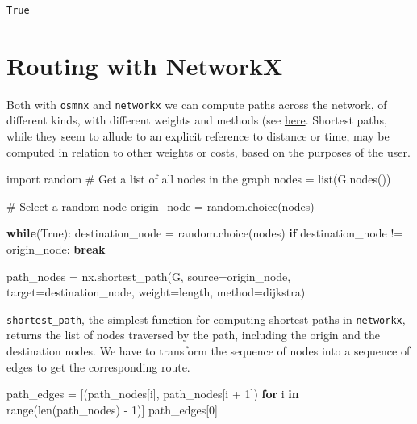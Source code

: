 \documentclass[
  letterpaper,
  DIV=11,
  numbers=noendperiod]{scrreprt}
\newenvironment{Shaded}{\begin{snugshade}}{\end{snugshade}}
\newcommand{\BuiltInTok}[1]{\textcolor[rgb]{0.00,0.23,0.31}{#1}}
\newcommand{\CommentTok}[1]{\textcolor[rgb]{0.37,0.37,0.37}{#1}}
\newcommand{\ControlFlowTok}[1]{\textcolor[rgb]{0.00,0.23,0.31}{\textbf{#1}}}
\newcommand{\DecValTok}[1]{\textcolor[rgb]{0.68,0.00,0.00}{#1}}
\newcommand{\ImportTok}[1]{\textcolor[rgb]{0.00,0.46,0.62}{#1}}
\newcommand{\KeywordTok}[1]{\textcolor[rgb]{0.00,0.23,0.31}{\textbf{#1}}}
\newcommand{\NormalTok}[1]{\textcolor[rgb]{0.00,0.23,0.31}{#1}}
\newcommand{\OperatorTok}[1]{\textcolor[rgb]{0.37,0.37,0.37}{#1}}
\newcommand{\StringTok}[1]{\textcolor[rgb]{0.13,0.47,0.30}{#1}}
\newcommand{\VariableTok}[1]{\textcolor[rgb]{0.07,0.07,0.07}{#1}}
\begin{document}
\begin{verbatim}
True
\end{verbatim}

\section{Routing with NetworkX}\label{routing-with-networkx}

Both with \texttt{osmnx} and \texttt{networkx} we can compute paths
across the network, of different kinds, with different weights and
methods (see
\href{https://networkx.org/documentation/stable/reference/algorithms/shortest_paths.html}{here}.
Shortest paths, while they seem to allude to an explicit reference to
distance or time, may be computed in relation to other weights or costs,
based on the purposes of the user.

\begin{Shaded}
\begin{Highlighting}[]
\ImportTok{import}\NormalTok{ random}
\CommentTok{\# Get a list of all nodes in the graph}
\NormalTok{nodes }\OperatorTok{=} \BuiltInTok{list}\NormalTok{(G.nodes())}

\CommentTok{\# Select a random node}
\NormalTok{origin\_node }\OperatorTok{=}\NormalTok{ random.choice(nodes)}

\ControlFlowTok{while}\NormalTok{(}\VariableTok{True}\NormalTok{):}
\NormalTok{    destination\_node }\OperatorTok{=}\NormalTok{ random.choice(nodes)}
    \ControlFlowTok{if}\NormalTok{ destination\_node }\OperatorTok{!=}\NormalTok{ origin\_node:}
        \ControlFlowTok{break}

\NormalTok{path\_nodes }\OperatorTok{=}\NormalTok{ nx.shortest\_path(G, source}\OperatorTok{=}\NormalTok{origin\_node, target}\OperatorTok{=}\NormalTok{destination\_node, weight}\OperatorTok{=}\StringTok{\textquotesingle{}length\textquotesingle{}}\NormalTok{, method}\OperatorTok{=}\StringTok{\textquotesingle{}dijkstra\textquotesingle{}}\NormalTok{)}
\end{Highlighting}
\end{Shaded}

\texttt{shortest\_path}, the simplest function for computing shortest
paths in \texttt{networkx}, returns the list of nodes traversed by the
path, including the origin and the destination nodes. We have to
transform the sequence of nodes into a sequence of edges to get the
corresponding route.

\begin{Shaded}
\begin{Highlighting}[]
\NormalTok{path\_edges }\OperatorTok{=}\NormalTok{ [(path\_nodes[i], path\_nodes[i }\OperatorTok{+} \DecValTok{1}\NormalTok{]) }\ControlFlowTok{for}\NormalTok{ i }\KeywordTok{in} \BuiltInTok{range}\NormalTok{(}\BuiltInTok{len}\NormalTok{(path\_nodes) }\OperatorTok{{-}} \DecValTok{1}\NormalTok{)] }
\NormalTok{path\_edges[}\DecValTok{0}\NormalTok{]}
\end{Highlighting}
\end{Shaded}
\end{document}
